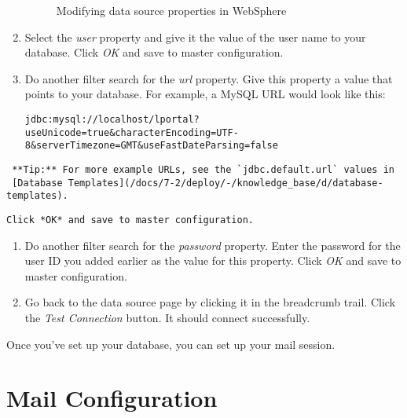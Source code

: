 \begin{enumerate}
  \begin{figure}
  \centering
  \caption{Modifying data source properties in WebSphere}
  \end{figure}
\item
  Select the \emph{user} property and give it the value of the user name
  to your database. Click \emph{OK} and save to master configuration.
\item
  Do another filter search for the \emph{url} property. Give this
  property a value that points to your database. For example, a MySQL
  URL would look like this:

\begin{verbatim}
jdbc:mysql://localhost/lportal?useUnicode=true&characterEncoding=UTF-8&serverTimezone=GMT&useFastDateParsing=false
\end{verbatim}
\end{enumerate}

\noindent\hrulefill

\begin{verbatim}
 **Tip:** For more example URLs, see the `jdbc.default.url` values in
 [Database Templates](/docs/7-2/deploy/-/knowledge_base/d/database-templates).
\end{verbatim}

\noindent\hrulefill

\begin{verbatim}
Click *OK* and save to master configuration.
\end{verbatim}

\begin{enumerate}
\def\labelenumi{\arabic{enumi}.}
\setcounter{enumi}{14}
\item
  Do another filter search for the \emph{password} property. Enter the
  password for the user ID you added earlier as the value for this
  property. Click \emph{OK} and save to master configuration.
\item
  Go back to the data source page by clicking it in the breadcrumb
  trail. Click the \emph{Test Connection} button. It should connect
  successfully.
\end{enumerate}

Once you've set up your database, you can set up your mail session.

\section{Mail Configuration}\label{mail-configuration-4}

